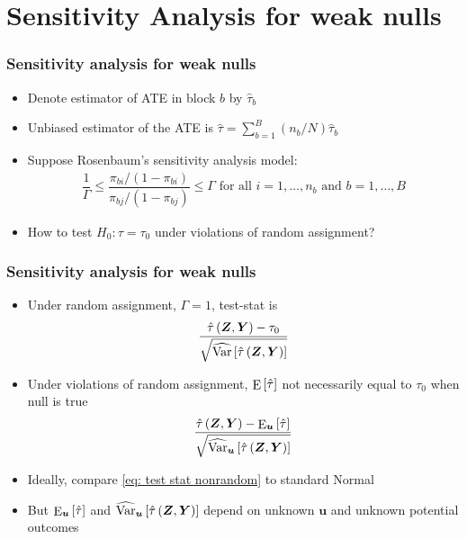 \documentclass[table, xcolor = {dvipsnames}, 9pt]{beamer}
\theoremstyle{plain}
\DeclareMathOperator{\E}{\rm{E}}
\DeclareMathOperator{\Var}{\rm{Var}}
\begin{document}
\section{Sensitivity Analysis for weak nulls}
\begin{frame}
\frametitle{Sensitivity analysis for weak nulls}
\vfill
\begin{itemize} \vfill
\item Denote estimator of ATE in block $b$ by $\hat{\tau}_b$ \vfill
\item Unbiased estimator of the ATE is $\hat{\tau} = \sum \limits_{b = 1}^B (n_b/N)\hat{\tau}_b$ \vfill
\item Suppose Rosenbaum's sensitivity analysis model: \vfill
\begin{align*}
\dfrac{1}{\Gamma} \leq \dfrac{\pi_{bi}/(1 - \pi_{bi})}{\pi_{bj} / (1 - \pi_{bj})} \leq \Gamma \text{ for all } i = 1, \ldots , n_b \text{ and } b = 1, \ldots , B
\end{align*} \vfill
\item How to test $H_0: \tau = \tau_0$ under violations of random assignment? \vfill
\end{itemize}
\vfill
\end{frame}
\begin{frame}[t]
\frametitle{Sensitivity analysis for weak nulls}
\vfill
\begin{itemize} \vfill
\item Under random assignment, $\Gamma = 1$, test-stat is \vfill
\begin{align*}
\frac{\hat{\tau}\left(\bm{Z}, \bm{Y}\right) - \tau_0}{\sqrt{\widehat{\Var}\left[\hat{\tau}\left(\bm{Z}, \bm{Y}\right)\right]}}
\end{align*} \vfill
\item Under violations of random assignment, $\E\left[\hat{\tau}\right]$ not necessarily equal to $\tau_0$ when null is true \vfill
\begin{align} \label{eq: test stat nonrandom}
\frac{\hat{\tau}\left(\bm{Z}, \bm{Y}\right) - \E_{\bm{u}}\left[\hat{\tau}\right]}{\sqrt{\widehat{\Var}_{\bm{u}}\left[\hat{\tau}\left(\bm{Z}, \bm{Y}\right)\right]}}
\end{align} \vfill
\item Ideally, compare \eqref{eq: test stat nonrandom} to standard Normal \vfill
\item But $\E_{\bm{u}}\left[\hat{\tau}\right]$ and $\widehat{\Var}_{\bm{u}}\left[\hat{\tau}\left(\bm{Z}, \bm{Y}\right)\right]$ depend on unknown $\bm{u}$ and unknown potential outcomes
\end{itemize}
\vfill
\end{frame}
\end{document}

